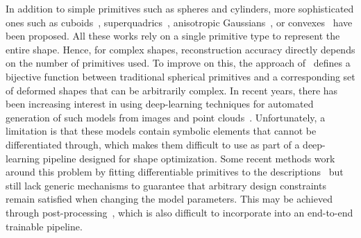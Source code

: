 In addition to simple primitives such as spheres and cylinders, more sophisticated ones such as cuboids~\cite{Tulsiani17b, Zou17a, Niu18, Sun19b, Kluger21, Smirnov20}, superquadrics~\cite{Paschalidou19, Paschalidou20}, anisotropic Gaussians~\cite{Genova19}, or convexes~\cite{Deng20c} have been proposed. All these works rely on a single primitive type to represent the entire shape. Hence, for complex shapes, reconstruction accuracy directly depends on the number of primitives used. To improve on this, the approach of~\cite{Paschalidou21} defines a bijective function between traditional spherical primitives and a corresponding set of deformed shapes that can be arbitrarily complex. In recent years, there has been increasing interest in using deep-learning techniques for automated generation of such models from images and point clouds~\cite{Para21,Willis22,Yu22b}. Unfortunately, a limitation is that these models contain symbolic elements that cannot be differentiated through, which makes them difficult to use as part of a deep-learning pipeline designed for shape optimization. Some recent methods work around this problem by fitting differentiable primitives to the descriptions~\cite{Uy22,Lambourne22,Deng22b} but still lack generic mechanisms to guarantee that arbitrary design constraints remain satisfied when changing the model parameters. This may be achieved through post-processing~\cite{Uy22}, which is also difficult to incorporate into an end-to-end trainable pipeline. 




%
%
%
%

